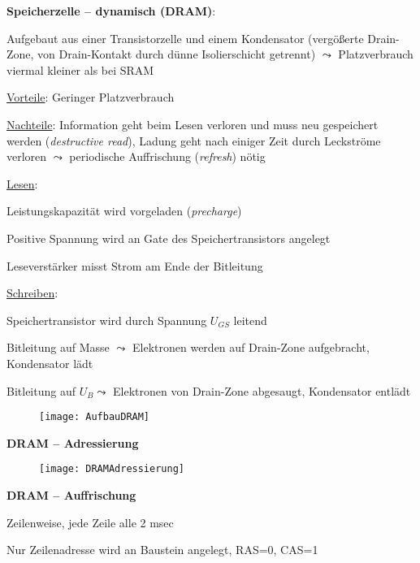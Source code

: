 \textbf{Speicherzelle -- dynamisch (DRAM)}:
\begin{items}
	\item Aufgebaut aus einer Transistorzelle und einem Kondensator (vergößerte Drain-Zone, von Drain-Kontakt durch dünne Isolierschicht getrennt) \( \leadsto \) Platzverbrauch viermal kleiner als bei SRAM
	\item \underline{Vorteile}: Geringer Platzverbrauch
	\item \underline{Nachteile}: Information geht beim Lesen verloren und muss neu gespeichert werden (\emph{destructive read}), Ladung geht nach einiger Zeit durch Leckströme verloren \( \leadsto \) periodische Auffrischung (\emph{refresh}) nötig
	\item \underline{Lesen}:
	\begin{enumeration}
		\item Leistungskapazität wird vorgeladen (\emph{precharge})
		\item Positive Spannung wird an Gate des Speichertransistors angelegt
		\item Leseverstärker misst Strom am Ende der Bitleitung
	\end{enumeration}
	\item \underline{Schreiben}: 
	\begin{enumeration}
		\item Speichertransistor wird durch Spannung \( U_{GS} \) leitend
		\item Bitleitung auf Masse  \( \leadsto \) Elektronen werden auf Drain-Zone aufgebracht, Kondensator lädt
		\item Bitleitung auf \( U_B \leadsto \) Elektronen von Drain-Zone abgesaugt, Kondensator entlädt 
	\end{enumeration}
\end{items}
\begin{figure}[H]\centering\label{AufbauDRAM}\texttt{[image: AufbauDRAM]}\end{figure}

\newpage

\textbf{DRAM -- Adressierung}
\begin{figure}[H]\centering\label{DRAMAdressierung}\texttt{[image: DRAMAdressierung]}\end{figure}

\textbf{DRAM -- Auffrischung}
\begin{items}
	\item Zeilenweise, jede Zeile alle 2 msec
	\item Nur Zeilenadresse wird an Baustein angelegt, RAS=0, CAS=1
\end{items}


